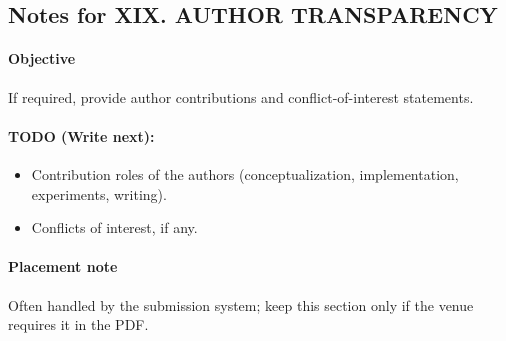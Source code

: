\subsection*{Notes for XIX. AUTHOR TRANSPARENCY}
\paragraph{Objective}
If required, provide author contributions and conflict-of-interest statements.

\paragraph{TODO (Write next):}
\begin{itemize}
  \item Contribution roles of the authors (conceptualization, implementation, experiments, writing).
  \item Conflicts of interest, if any.
\end{itemize}

\paragraph{Placement note}
Often handled by the submission system; keep this section only if the venue requires it in the PDF.
